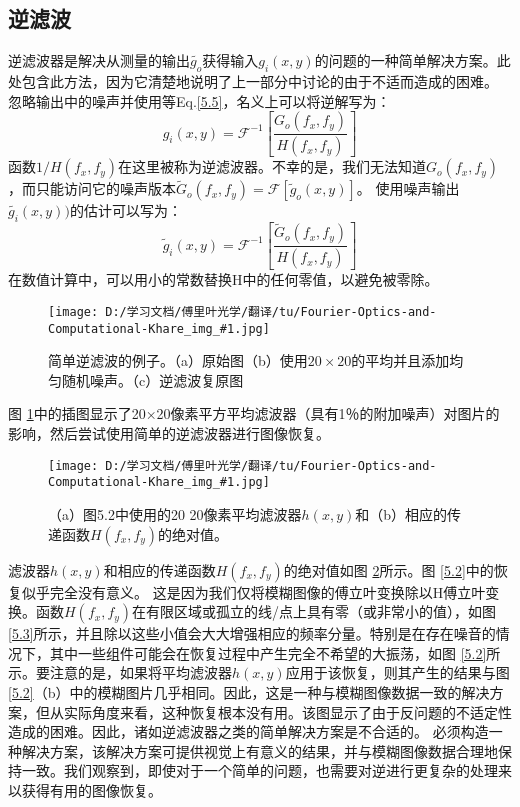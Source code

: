 \documentclass[12pt, UTF8]{ctexart}%
\numberwithin{equation}{section}
\numberwithin{figure}{section}
\newcommand {\InsertPic}[3]{\begin{figure}[htbp]\centering \texttt{[image: D:/学习文档/傅里叶光学/翻译/tu/Fourier-Optics-and-Computational-Khare\_img\_\#1.jpg]}\caption{#3}  \label{#2}\end{figure}}%
\newcommand{\InsertEqution}[2]{\begin{equation}
  \label{#1}
   #2
 \end{equation}}
\newcommand{\RefEq}[1]{Eq.\ref{#1}}
\newcommand{\InsertInlineEq}[1]{$#1$}
\newcommand{\RefFig}[1]{图 \ref{#1}}
\begin{document}
\begin{sloppypar}
\subsection{逆滤波}
逆滤波器是解决从测量的输出\InsertInlineEq{\tilde{g_o}}获得输入\InsertInlineEq{g_i(x,y)}的问题的一种简单解决方案。此处包含此方法，因为它清楚地说明了上一部分中讨论的由于不适而造成的困难。 忽略输出中的噪声并使用等\RefEq{5.5}，名义上可以将逆解写为：
\InsertEqution{5.7}{g_{i}(x, y)=\mathcal{F}^{-1}\left[\frac{G_{o}\left(f_{x}, f_{y}\right)}{H\left(f_{x}, f_{y}\right)}\right]}
函数\InsertInlineEq{1/H(f_x,f_y)}在这里被称为逆滤波器。不幸的是，我们无法知道\InsertInlineEq{G_o(f_x,f_y)}，而只能访问它的噪声版本\InsertInlineEq{\tilde{G}_{o}\left(f_{x}, f_{y}\right)=\mathcal{F}\left[\tilde{g}_{o}(x, y)\right]}。 使用噪声输出\InsertInlineEq{\tilde{g_i}(x,y))}的估计可以写为：
\InsertEqution{5.8}{\tilde{g}_{i}(x, y)=\mathcal{F}^{-1}\left[\frac{\tilde{G}_{o}\left(f_{x}, f_{y}\right)}{H\left(f_{x}, f_{y}\right)}\right]}
在数值计算中，可以用小的常数替换H中的任何零值，以避免被零除。\InsertPic{20}{F5.2}{简单逆滤波的例子。（a）原始图（b）使用\InsertInlineEq{20\times20}的平均并且添加均匀随机噪声。（c）逆滤波复原图}\RefFig{F5.2}中的插图显示了20×20像素平方平均滤波器（具有1％的附加噪声）对图片的影响，然后尝试使用简单的逆滤波器进行图像恢复。
\InsertPic{21}{F5.3}{（a）图5.2中使用的20 20像素平均滤波器\InsertInlineEq{h(x,y)}和（b）相应的传递函数\InsertInlineEq{H(f_x,f_y)}的绝对值。}滤波器\InsertInlineEq{h(x,y)}和相应的传递函数\InsertInlineEq{H(f_x,f_y)}的绝对值如\RefFig{F5.3}所示。\RefFig{5.2}中的恢复似乎完全没有意义。 这是因为我们仅将模糊图像的傅立叶变换除以H傅立叶变换。函数\InsertInlineEq{H(f_x,f_y)}在有限区域或孤立的线/点上具有零（或非常小的值），如\RefFig{5.3}所示，并且除以这些小值会大大增强相应的频率分量。特别是在存在噪音的情况下，其中一些组件可能会在恢复过程中产生完全不希望的大振荡，如\RefFig{5.2}所示。要注意的是，如果将平均滤波器\InsertInlineEq{h(x,y)}应用于该恢复，则其产生的结果与\RefFig{5.2}（b）中的模糊图片几乎相同。因此，这是一种与模糊图像数据一致的解决方案，但从实际角度来看，这种恢复根本没有用。该图显示了由于反问题的不适定性造成的困难。因此，诸如逆滤波器之类的简单解决方案是不合适的。 必须构造一种解决方案，该解决方案可提供视觉上有意义的结果，并与模糊图像数据合理地保持一致。我们观察到，即使对于一个简单的问题，也需要对逆进行更复杂的处理来以获得有用的图像恢复。

\end{sloppypar}
\end{document}
